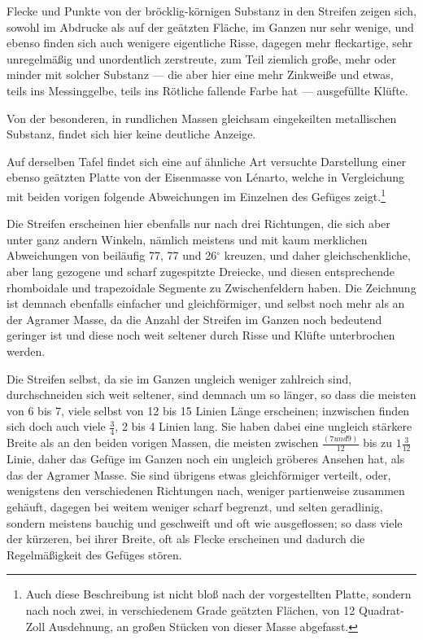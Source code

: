 \documentclass[a4paper, 11pt, oneside, german]{article}
\begin{document}
Flecke und Punkte von der bröcklig-körnigen Substanz in den Streifen zeigen sich, sowohl im Abdrucke als auf der geätzten Fläche, im Ganzen nur sehr wenige, und ebenso finden sich auch wenigere eigentliche Risse, dagegen mehr fleckartige, sehr unregelmäßig und unordentlich zerstreute, zum Teil ziemlich große, mehr oder minder mit solcher Substanz --- die aber hier eine mehr Zinkweiße und etwas, teils ins Messinggelbe, teils ins Rötliche fallende Farbe hat --- ausgefüllte Klüfte.

Von der besonderen, in rundlichen Massen gleichsam eingekeilten metallischen Substanz, findet sich hier keine deutliche Anzeige.

Auf derselben Tafel findet sich eine auf ähnliche Art versuchte Darstellung einer ebenso geätzten Platte von der Eisenmasse von Lénarto, welche in Vergleichung mit beiden vorigen folgende Abweichungen im Einzelnen des Gefüges zeigt.\footnote{Auch diese Beschreibung ist nicht bloß nach der vorgestellten Platte, sondern nach noch zwei, in verschiedenem Grade geätzten Flächen, von 12 Quadrat-Zoll Ausdehnung, an großen Stücken von dieser Masse abgefasst.}

Die Streifen erscheinen hier ebenfalls nur nach drei Richtungen, die sich aber unter ganz andern Winkeln, nämlich meistens und mit kaum merklichen Abweichungen von beiläufig 77, 77 und 26$^{\circ}$ kreuzen, und daher gleichschenkliche, aber lang gezogene und scharf zugespitzte Dreiecke, und diesen entsprechende rhomboidale und trapezoidale Segmente zu Zwischenfeldern haben. Die Zeichnung ist demnach ebenfalls einfacher und gleichförmiger, und selbst noch mehr als an der Agramer Masse, da die Anzahl der Streifen im Ganzen noch bedeutend geringer ist und diese noch weit seltener durch Risse und Klüfte unterbrochen werden.

Die Streifen selbst, da sie im Ganzen ungleich weniger zahlreich sind, durchschneiden sich weit seltener, sind demnach um so länger, so dass die meisten von 6 bis 7, viele selbst von 12 bis 15 Linien Länge erscheinen; inzwischen finden sich doch auch viele $\frac{3}{4}$, 2 bis 4 Linien lang. Sie haben dabei eine ungleich stärkere Breite als an den beiden vorigen Massen, die meisten zwischen $\frac{(7 und 9)}{12}$ bis zu $1\frac{3}{12}$ Linie, daher das Gefüge im Ganzen noch ein ungleich gröberes Ansehen hat, als das der Agramer Masse. Sie sind übrigens etwas gleichförmiger verteilt, oder, wenigstens den verschiedenen Richtungen nach, weniger partienweise zusammen gehäuft, dagegen bei weitem weniger scharf begrenzt, und selten geradlinig, sondern meistens bauchig und geschweift und oft wie ausgeflossen; so dass viele der kürzeren, bei ihrer Breite, oft als Flecke erscheinen und dadurch die Regelmäßigkeit des Gefüges stören.
\end{document}
